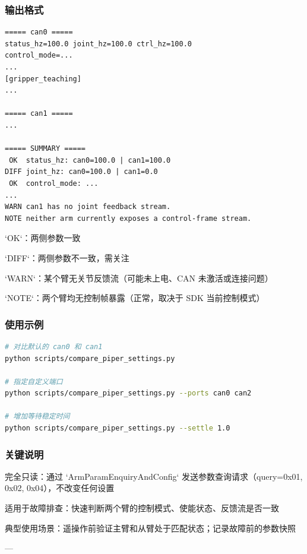 \documentclass[UTF8,a4paper,11pt]{ctexart}
\begin{document}
{\subsubsection{输出格式}

\begin{lstlisting}[language=text]
===== can0 =====
status_hz=100.0 joint_hz=100.0 ctrl_hz=100.0
control_mode=...
...
[gripper_teaching]
...

===== can1 =====
...

===== SUMMARY =====
 OK  status_hz: can0=100.0 | can1=100.0
DIFF joint_hz: can0=100.0 | can1=0.0
 OK  control_mode: ...
...
WARN can1 has no joint feedback stream.
NOTE neither arm currently exposes a control-frame stream.
\end{lstlisting}

\item `OK`：两侧参数一致
\item `DIFF`：两侧参数不一致，需关注
\item `WARN`：某个臂无关节反馈流（可能未上电、CAN 未激活或连接问题）
\item `NOTE`：两个臂均无控制帧暴露（正常，取决于 SDK 当前控制模式）

\subsubsection{使用示例}

\begin{lstlisting}[language=bash]
# 对比默认的 can0 和 can1
python scripts/compare_piper_settings.py

# 指定自定义端口
python scripts/compare_piper_settings.py --ports can0 can2

# 增加等待稳定时间
python scripts/compare_piper_settings.py --settle 1.0
\end{lstlisting}

\subsubsection{关键说明}

\item 完全只读：通过 `ArmParamEnquiryAndConfig` 发送参数查询请求（query=0x01, 0x02, 0x04），不改变任何设置
\item 适用于故障排查：快速判断两个臂的控制模式、使能状态、反馈流是否一致
\item 典型使用场景：遥操作前验证主臂和从臂处于匹配状态；记录故障前的参数快照

---

}
\end{document}
